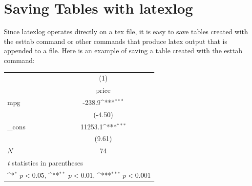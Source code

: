 \documentclass{article}
\begin{document}
\section{Saving Tables with latexlog}
Since latexlog operates directly on a tex file, it is easy to save 
tables created with the esttab command or other commands that 
produce latex output that is appended to a file.
Here is an example of saving a table created with the esttab command:
 
\vspace{10pt}
{
\def\sym#1{\ifmmode^{#1}\else\(^{#1}\)\fi}
\begin{tabular}{l*{1}{c}}
\toprule
            &\multicolumn{1}{c}{(1)}\\
            &\multicolumn{1}{c}{price}\\
\midrule
mpg         &      -238.9\sym{***}\\
            &     (-4.50)         \\
\addlinespace
\_cons      &     11253.1\sym{***}\\
            &      (9.61)         \\
\midrule
\(N\)       &          74         \\
\bottomrule
\multicolumn{2}{l}{\footnotesize \textit{t} statistics in parentheses}\\
\multicolumn{2}{l}{\footnotesize \sym{*} \(p<0.05\), \sym{**} \(p<0.01\), \sym{***} \(p<0.001\)}\\
\end{tabular}
}
\end{document}
